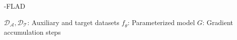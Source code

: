 \begin{algorithm}[t]
\caption{\ex{}-FLAD}
\label{alg:exp3}
\small
\begin{algorithmic}[1]




    
    
    
    
    
        
        
        
        
            

\REQUIRE $\mathcal{D}_{\mathcal{A}},\mathcal{D}_{\mathcal{T}}$: Auxiliary and target datasets
\REQUIRE $\mathit{f}_{\theta}$: Parameterized model
\REQUIRE $G$: Gradient accumulation steps


\end{algorithmic}
\end{algorithm}
